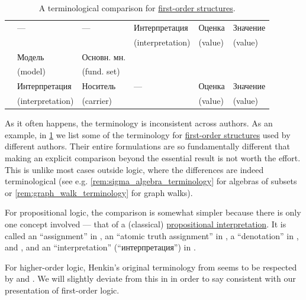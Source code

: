 \begin{remark}
\begin{table}
\begin{tabular}{*{6}{l}}
      \cite[ch. 3]{ШеньВерещагин2017ЯзыкиИИсчисления}             & ---                & ---         & Интерпретация    & Оценка     & Значение       \\
                                                                  &                    &             & (interpretation) & (value)    & (value)        \\
      \cite[ch. 2]{Эдельман1975Логика}                            & Модель             & Основн. мн. &                  &            &                \\
                                                                  & (model)            & (fund. set) &                  &            &                \\
      \cite[\S 2.2]{Герасимов2014Вычислимость}                    & Интерпретация      & Носитель    & ---              & Оценка     & Значение       \\
                                                                  & (interpretation)   & (carrier)   &                  & (value)    & (value)        \\
      \bottomrule
    \end{tabular}
    \caption{A terminological comparison for \hyperref[def:fol_structure]{first-order structures}.}\label{tab:rem:model_theory_structure_terminology}
  \end{table}

  As it often happens, the terminology is inconsistent across authors. As an example, in \cref{tab:rem:model_theory_structure_terminology} we list some of the terminology for \hyperref[def:fol_structure]{first-order structures} used by different authors. Their entire formulations are so fundamentally different that making an explicit comparison beyond the essential result is not worth the effort. This is unlike most cases outside logic, where the differences are indeed terminological (see e.g. \cref{rem:sigma_algebra_terminology} for algebras of subsets or \cref{rem:graph_walk_terminology} for graph walks).

  For propositional logic, the comparison is somewhat simpler because there is only one concept involved --- that of a (classical) \hyperref[def:propositional_interpretation]{propositional interpretation}. It is called an \enquote{assignment} in \cite[50]{Andrews2002Logic}, an \enquote{atomic truth assignment} in \cite[def. 1.1.6]{Hinman2005Logic}, a \enquote{denotation} in \cite[def. 1.2.1]{VanDalen2004LogicAndStructure}, \cite[\S 2.5.6]{Mimram2020ProgramEqualsProof} and \cite[\S 3.2]{CitkinMuravitsky2022ConsequenceRelations}, and an \enquote{interpretation} (\enquote{интерпретация}) in \cite[def. 1.1.10]{Герасимов2014Вычислимость}.

  For higher-order logic, Henkin's original terminology from \cite[84]{Henkin1950CompletenessInTheoryOfTypes} seems to be respected by \cite[238]{Andrews2002Logic} and \cite[271]{Farmer2008STTVirtues}. We will slightly deviate from this in  in order to say consistent with our presentation of first-order logic.
\end{remark}

